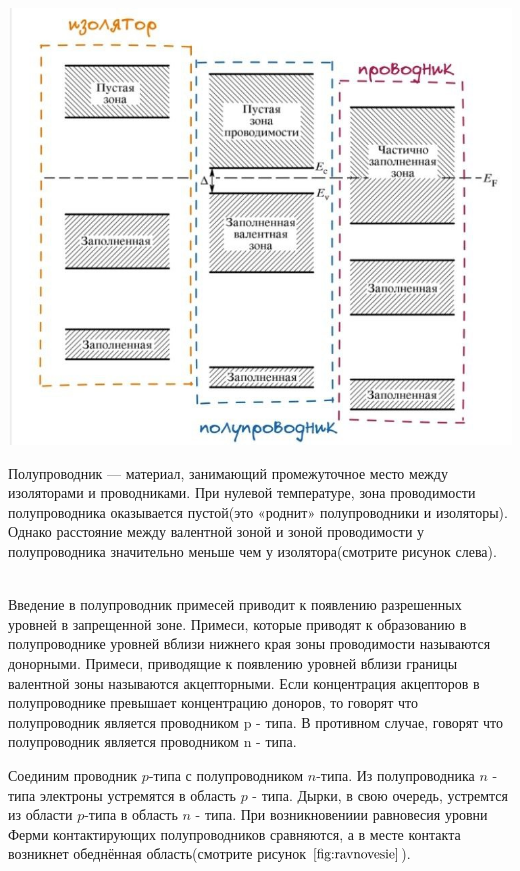 \documentclass[a4paper, 12pt]{extarticle}
\begin{document}
\begin{minipage}{0.6 \textwidth}
    \includegraphics*[width = \linewidth]{pics/isolator.jpg}
\end{minipage}
\hfil
\begin{minipage}{0.4\textwidth}\raggedright
    \textcolor{defenition}{Полупроводник} — материал, занимающий промежуточное место между изоляторами и проводниками. 
    При нулевой температуре, зона проводимости полупроводника оказывается пустой(это «роднит» полупроводники и изоляторы).
    Однако расстояние между валентной зоной и зоной проводимости у полупроводника значительно меньше чем у изолятора(смотрите рисунок слева).
\end{minipage}
\noindent 
\\
Введение в полупроводник примесей приводит к появлению разрешенных уровней в запрещенной зоне. 
Примеси, которые приводят к образованию в полупроводнике уровней вблизи нижнего края зоны проводимости называются \textcolor{defenition}{донорными}.
Примеси, приводящие к появлению уровней вблизи границы валентной зоны называются \textcolor{defenition}{акцепторными}. Если концентрация акцепторов 
в полупроводнике превышает концентрацию доноров, 
то говорят что полупроводник является проводником \textcolor{defenition}{p - типа}. 
В противном случае, говорят что полупроводник является проводником \textcolor{defenition}{n - типа}.


Соединим проводник $p$-типа с полупроводником $n$-типа. Из полупроводника 
$n$ - типа электроны устремятся в область $p$ - типа. Дырки, в свою очередь,
устремтся из области $p$-типа в область $n$ - типа. При возникновениии равновесия
уровни Ферми контактирующих полупроводников сравняются, а в месте контакта
возникнет обеднённая область(смотрите рисунок $\ref{fig:ravnovesie}$).
\end{document}
